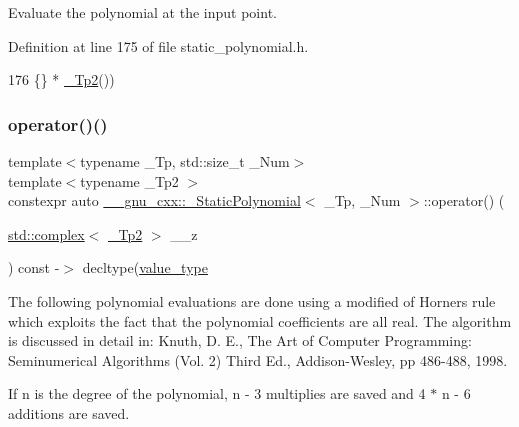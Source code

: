 Evaluate the polynomial at the input point. 

Definition at line 175 of file static\+\_\+polynomial.\+h.


\begin{DoxyCode}
176                               \{\} * \hyperlink{class____gnu__cxx_1_1__StaticPolynomial_a111ee5aedd5ae8c0b4d8fa8f29d1f9b9}{\_Tp2}())
\end{DoxyCode}
\mbox{\label{class____gnu__cxx_1_1__StaticPolynomial_aacdd65335ac346c45cc3af7689cade38}} 
\subsubsection{\texorpdfstring{operator()()}{operator()()}\hspace{0.1cm}{\footnotesize\ttfamily [3/4]}}
{\footnotesize\ttfamily template$<$typename \+\_\+\+Tp, std\+::size\+\_\+t \+\_\+\+Num$>$ \\
template$<$typename \+\_\+\+Tp2 $>$ \\
constexpr auto \hyperlink{class____gnu__cxx_1_1__StaticPolynomial}{\+\_\+\+\_\+gnu\+\_\+cxx\+::\+\_\+\+Static\+Polynomial}$<$ \+\_\+\+Tp, \+\_\+\+Num $>$\+::operator() (\begin{DoxyParamCaption}\item[{\hyperlink{classstd_1_1complex}{std\+::complex}$<$ \hyperlink{class____gnu__cxx_1_1__StaticPolynomial_a111ee5aedd5ae8c0b4d8fa8f29d1f9b9}{\+\_\+\+Tp2} $>$}]{\+\_\+\+\_\+z }\end{DoxyParamCaption}) const -\/$>$ decltype(\hyperlink{class____gnu__cxx_1_1__StaticPolynomial_af23110f5a002cd6caa3542df7cf35284}{value\+\_\+type}\hspace{0.3cm}{\ttfamily [inline]}}

The following polynomial evaluations are done using a modified of Horner\textquotesingle{}s rule which exploits the fact that the polynomial coefficients are all real. The algorithm is discussed in detail in\+: Knuth, D. E., The Art of Computer Programming\+: Seminumerical Algorithms (Vol. 2) Third Ed., Addison-\/\+Wesley, pp 486-\/488, 1998.

If n is the degree of the polynomial, n -\/ 3 multiplies are saved and 4 $\ast$ n -\/ 6 additions are saved. 


